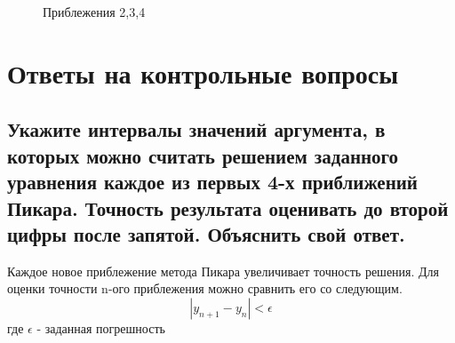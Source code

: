 \documentclass[12pt]{report}
\begin{document}
\begin{figure}[h]
	\caption{Приблежения 2,3,4}
	\label{fig:f_p}
\end{figure}

\chapter{Ответы на контрольные вопросы}

\section*{Укажите интервалы значений аргумента, в которых можно считать решением заданного уравнения каждое из первых 4-х приближений Пикара. Точность результата оценивать до второй цифры после запятой. Объяснить свой ответ.}
Каждое новое приблежение метода Пикара увеличивает точность решения. Для оценки точности n-ого приблежения можно сравнить его со следующим.
\begin{equation}
	|y_{n+1} - y_n| < \epsilon
\end{equation}
где $\epsilon$ - заданная погрешность
\end{document}
